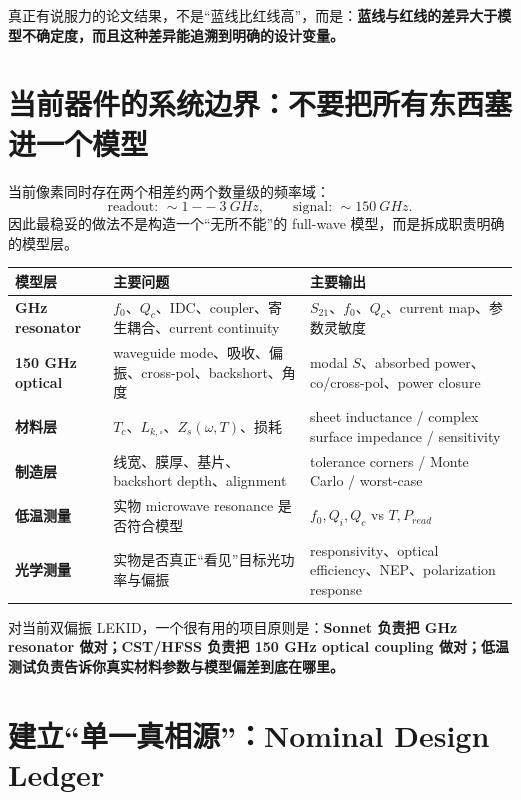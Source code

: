 \documentclass[11pt,a4paper,openany]{ctexrep}
\begin{document}
\begin{intuitionbox}
真正有说服力的论文结果，不是“蓝线比红线高”，而是：\textbf{蓝线与红线的差异大于模型不确定度，而且这种差异能追溯到明确的设计变量。}
\end{intuitionbox}

\section{当前器件的系统边界：不要把所有东西塞进一个模型}

当前像素同时存在两个相差约两个数量级的频率域：
\[
\text{readout: }\sim\SI{1}{--}\SI{3}{GHz},
\qquad
\text{signal: }\sim\SI{150}{GHz}.
\]
因此最稳妥的做法不是构造一个“无所不能”的 full-wave 模型，而是拆成职责明确的模型层。

\begin{center}
\noindent\begin{tabularx}{\textwidth}{>{\bfseries}p{2.4cm} X X}
\toprule
模型层 & 主要问题 & 主要输出 \\
\midrule
GHz resonator & $f_0$、$Q_c$、IDC、coupler、寄生耦合、current continuity & $S_{21}$、$f_0$、$Q_c$、current map、参数灵敏度 \\
150 GHz optical & waveguide mode、吸收、偏振、cross-pol、backshort、角度 & modal $S$、absorbed power、co/cross-pol、power closure \\
材料层 & $T_c$、$L_{k,\square}$、$Z_s(\omega,T)$、损耗 & sheet inductance / complex surface impedance / sensitivity \\
制造层 & 线宽、膜厚、基片、backshort depth、alignment & tolerance corners / Monte Carlo / worst-case \\
低温测量 & 实物 microwave resonance 是否符合模型 & $f_0,Q_i,Q_c$ vs $T,P_{read}$ \\
光学测量 & 实物是否真正“看见”目标光功率与偏振 & responsivity、optical efficiency、NEP、polarization response \\
\bottomrule
\end{tabularx}
\end{center}

\begin{projectbox}
对当前双偏振 LEKID，一个很有用的项目原则是：\textbf{Sonnet 负责把 GHz resonator 做对；CST/HFSS 负责把 150 GHz optical coupling 做对；低温测试负责告诉你真实材料参数与模型偏差到底在哪里。}
\end{projectbox}

\section{建立“单一真相源”：Nominal Design Ledger}
\end{document}
